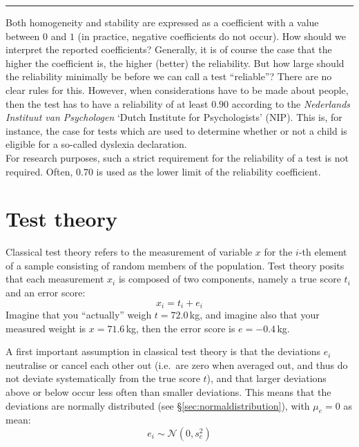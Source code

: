 \documentclass[
]{book}
\begin{document}
\begin{center}\rule{0.5\linewidth}{0.5pt}\end{center}

Both homogeneity and stability are expressed as a
coefficient with a value between \(0\) and \(1\) (in practice, negative coefficients
do not occur). How should we interpret the reported
coefficients? Generally, it is of course the case that the higher the coefficient is,
the higher (better) the reliability. But how large should the reliability minimally be
before we can call a test ``reliable''? There are no clear rules for this.
However, when considerations have to be made about people, then the test has to
have a reliability of at least \(0.90\) according to the \emph{Nederlands
Instituut van Psychologen} `Dutch Institute for Psychologists' (NIP).
This is, for instance, the case for tests which are used to determine whether or not a child is eligible for a so-called dyslexia declaration.\\
For research purposes, such a strict requirement for the reliability of a
test is not required. Often, \(0.70\) is used as the lower limit of the
reliability coefficient.

\hypertarget{test-theory}{%
\section{Test theory}\label{test-theory}}

Classical test theory refers to the measurement of variable \(x\)
for the \(i\)-th element of a sample consisting of random members of the
population. Test theory posits that each measurement \(x_i\) is composed
of two components, namely a true score \(t_i\) and an error score:\\
\begin{equation}
  x_i = t_i + e_i
  \label{eq:obs-true-error}
\end{equation}
Imagine that you ``actually'' weigh \(t=72.0\) kg, and imagine also
that your measured weight is \(x=71.6\) kg, then the error score
is \(e=-0.4\) kg.

A first important assumption in classical test theory is that
the deviations \(e_i\) neutralise or cancel each other out (i.e.~are zero when averaged
out, and thus do not deviate systematically from the true score \(t\)), and
that larger deviations above or below occur less often than smaller
deviations. This means that the deviations are normally distributed (see
§\ref{sec:normaldistribution}), with \(\mu_e=0\) as mean:
\begin{equation}
  \label{eq:normal-error}
  e_i \sim \mathcal{N}(0,s^2_e)
\end{equation}
\end{document}
